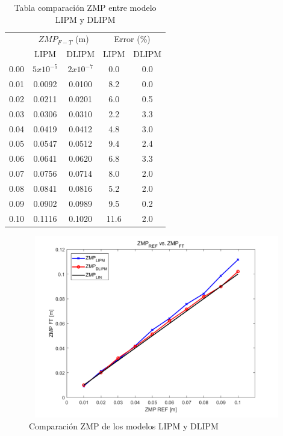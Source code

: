 \begin{table}[H]
\centering
\begin{tabular}{|c|c|c|c|c|}
\hline
\rowcolor[gray]{0.7} 
\cellcolor[gray]{0.7}  & \multicolumn{2}{c|}{\cellcolor[gray]{0.7}$ZMP_{F-T}$ (m)} & \multicolumn{2}{c|}{\cellcolor[gray]{0.7}Error (\%)} \\ 
\cline{2-5} 
\rowcolor[gray]{0.9}
\multirow{-2}{*}{\cellcolor[gray]{0.7}$ZMP_{ref}$ (m)} & LIPM & DLIPM & LIPM & DLIPM \\ 
\hline
0.00 & $5x10^{-5}$ & $2x10^{-7}$ & 0.0 & 0.0 \\ 
\hline
0.01 & 0.0092 & 0.0100 & 8.2 & 0.0 \\ 
\hline
0.02 & 0.0211 & 0.0201 & 6.0 & 0.5 \\ 
\hline
0.03 & 0.0306 & 0.0310 & 2.2 & 3.3 \\ 
\hline
0.04 & 0.0419 & 0.0412 & 4.8 & 3.0 \\ 
\hline
0.05 & 0.0547 & 0.0512 & 9.4 & 2.4 \\ 
\hline
0.06 & 0.0641 & 0.0620 & 6.8 & 3.3 \\ 
\hline
0.07 & 0.0756 & 0.0714 & 8.0 & 2.0 \\ 
\hline
0.08 & 0.0841 & 0.0816 & 5.2 & 2.0 \\ 
\hline
0.09 & 0.0902 & 0.0989 & 9.5 & 0.2 \\ 
\hline
0.10 & 0.1116 & 0.1020 & 11.6 & 2.0 \\ 
\hline
\end{tabular}
\caption{Tabla comparación ZMP entre modelo LIPM y DLIPM}
\label{tabla52}
\end{table}

\begin{figure}[H]
\centering
\includegraphics[width=13cm, height=8cm]{imagenes/apartado_5/513_compErrorModels}
\caption{Comparación ZMP de los modelos LIPM y DLIPM}
\label{figura513}
\end{figure}


